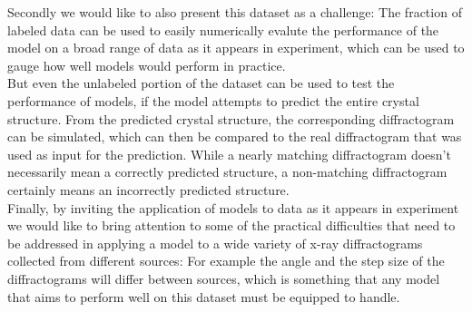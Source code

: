 Secondly we would like to also present this dataset as a challenge: The fraction of labeled data can be used to easily numerically evalute the performance of the model on a broad range of data as it appears in experiment, which can be used to gauge how well models would perform in practice. \\
But even the unlabeled portion of the dataset can be used to test the performance of models, if the model attempts to predict the entire crystal structure. From the predicted crystal structure, the corresponding diffractogram can be simulated, which can then be compared to the real diffractogram that was used as input for the prediction. While a nearly matching diffractogram doesn't necessarily mean a correctly predicted structure, a non-matching diffractogram certainly means an incorrectly predicted structure. \\


Finally, by inviting the application of models to data as it appears in experiment we would like to bring attention
to some of the practical difficulties that need to be addressed in applying a model to a wide variety of x-ray diffractograms
collected from different sources: For example the angle and the step size of the diffractograms will differ between sources, 
which is something that any model that aims to perform well on this dataset must be equipped to handle.






